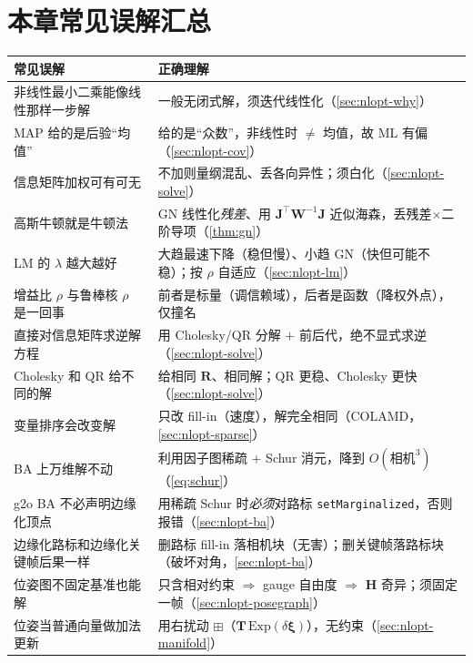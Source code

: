 \section*{本章常见误解汇总}
\begin{table}[H]\centering\small
\begin{tabular}{p{} p{}}
\toprule
\textbf{常见误解} & \textbf{正确理解} \\
\midrule
非线性最小二乘能像线性那样一步解 & 一般无闭式解，须迭代线性化（\cref{sec:nlopt-why}）\\
MAP 给的是后验“均值” & 给的是“众数”，非线性时 $\ne$ 均值，故 ML 有偏（\cref{sec:nlopt-cov}）\\
信息矩阵加权可有可无 & 不加则量纲混乱、丢各向异性；须白化（\cref{sec:nlopt-solve}）\\
高斯牛顿就是牛顿法 & GN 线性化\emph{残差}、用 $\mathbf{J}^\top\mathbf{W}^{-1}\mathbf{J}$ 近似海森，丢残差$\times$二阶导项（\cref{thm:gn}）\\
LM 的 $\lambda$ 越大越好 & 大趋最速下降（稳但慢）、小趋 GN（快但可能不稳）；按 $\rho$ 自适应（\cref{sec:nlopt-lm}）\\
增益比 $\rho$ 与鲁棒核 $\rho$ 是一回事 & 前者是标量（调信赖域），后者是函数（降权外点），仅撞名 \\
直接对信息矩阵求逆解方程 & 用 Cholesky/QR 分解 $+$ 前后代，绝不显式求逆（\cref{sec:nlopt-solve}）\\
Cholesky 和 QR 给不同的解 & 给相同 $\mathbf{R}$、相同解；QR 更稳、Cholesky 更快（\cref{sec:nlopt-solve}）\\
变量排序会改变解 & 只改 fill-in（速度），解完全相同（COLAMD，\cref{sec:nlopt-sparse}）\\
BA 上万维解不动 & 利用因子图稀疏 $+$ Schur 消元，降到 $O(\text{相机}^3)$（\cref{eq:schur}）\\
g2o BA 不必声明边缘化顶点 & 用稀疏 Schur 时\emph{必须}对路标 \texttt{setMarginalized}，否则报错（\cref{sec:nlopt-ba}）\\
边缘化路标和边缘化关键帧后果一样 & 删路标 fill-in 落相机块（无害）；删关键帧落路标块（破坏对角，\cref{sec:nlopt-ba}）\\
位姿图不固定基准也能解 & 只含相对约束 $\Rightarrow$ gauge 自由度 $\Rightarrow$ $\mathbf{H}$ 奇异；须固定一帧（\cref{sec:nlopt-posegraph}）\\
位姿当普通向量做加法更新 & 用右扰动 $\boxplus$（$\mathbf{T}\,\mathrm{Exp}(\delta\boldsymbol{\xi})$），无约束（\cref{sec:nlopt-manifold}）\\

\end{tabular}
\end{table}
